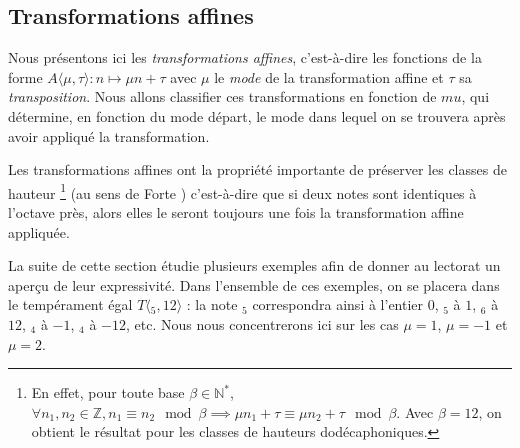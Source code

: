 \subsection{Transformations affines}

Nous présentons ici les \emph{transformations affines}, c'est-à-dire les fonctions de la forme $A\langle\mu,\tau\rangle : n \mapsto \mu n + \tau$ avec $\mu$ le \emph{mode} de la transformation affine et $\tau$ sa \emph{transposition}. Nous allons classifier ces transformations en fonction de $mu$, qui détermine, en fonction du mode départ, le mode dans lequel on se trouvera après avoir appliqué la transformation. 

Les transformations affines ont la propriété importante de préserver les classes de hauteur \footnote{En effet, pour toute base $\beta\in \mathbb{N}^*$, $\forall n_1,n_2 \in \mathbb{Z}, n_1 \equiv n_2 \mod \beta \implies \mu n_1 + \tau \equiv \mu n_2 + \tau \mod \beta$. Avec $\beta=12$, on obtient le résultat pour les classes de hauteurs dodécaphoniques. }  (au sens de Forte \cite{forte1973structure}) c'est-à-dire que si deux notes sont identiques à l'octave près, alors elles le seront toujours une fois la transformation affine appliquée. 

La suite de cette section étudie plusieurs exemples afin de donner au lectorat un aperçu de leur expressivité. Dans l'ensemble de ces exemples, on se placera dans le tempérament égal $T\langle $$_5,12\rangle$ : la note $_5$ correspondra ainsi à l'entier $0$, $_5$ à $1$, $_6$ à $12$, $_4$ à $-1$, $_4$ à $-12$, etc. Nous nous concentrerons ici sur les cas $\mu = 1$, $\mu = -1$ et $\mu = 2$.
